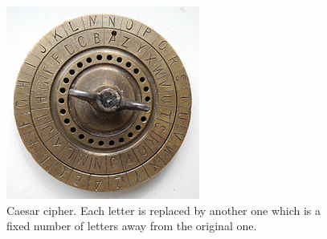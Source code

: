 \begin{refsection}
\begin{minipage}{0.45\linewidth}
	\begin{figure}[H]
		\centering
		\includegraphics[width=\linewidth]{../chapter00/CaesarCipher.jpg}
		\caption[Caesar cipher]{Caesar cipher. Each letter is replaced by another one which is a fixed number of letters away from the original one. }
		\label{fig:preface:caesar_cipher}
	\end{figure}
\end{minipage}
\hfill
\begin{minipage}{0.45\linewidth}
	\begin{figure}[H]
		\centering

\end{figure}
\end{minipage}
\end{refsection}
